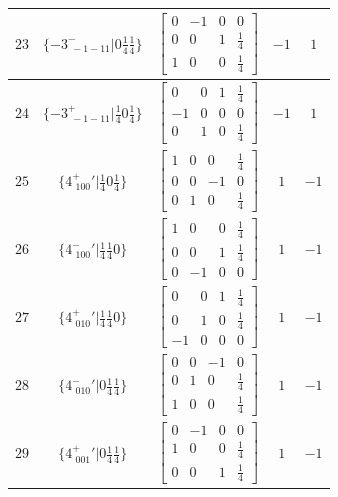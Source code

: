 \documentclass[fleqn,8pt]{jsarticle}
\begin{document}
\begin{longtable}{ccccc}
$ 23 $ & $ \{-3^{-}_{\,\,-1-11}|0 \frac{1}{4} \frac{1}{4}\} $ & $ \begin{bmatrix} 0 & -1 & 0 & 0 \\ 0 & 0 & 1 & \frac{1}{4} \\ 1 & 0 & 0 & \frac{1}{4} \end{bmatrix} $ & $ -1 $ & $ 1 $ \\ \hline
$ 24 $ & $ \{-3^{+}_{\,\,-1-11}|\frac{1}{4} 0 \frac{1}{4}\} $ & $ \begin{bmatrix} 0 & 0 & 1 & \frac{1}{4} \\ -1 & 0 & 0 & 0 \\ 0 & 1 & 0 & \frac{1}{4} \end{bmatrix} $ & $ -1 $ & $ 1 $ \\ \hline
$ 25 $ & $ \{4^{+}_{\,\,100}{}'|\frac{1}{4} 0 \frac{1}{4}\} $ & $ \begin{bmatrix} 1 & 0 & 0 & \frac{1}{4} \\ 0 & 0 & -1 & 0 \\ 0 & 1 & 0 & \frac{1}{4} \end{bmatrix} $ & $ 1 $ & $ -1 $ \\ \hline
$ 26 $ & $ \{4^{-}_{\,\,100}{}'|\frac{1}{4} \frac{1}{4} 0\} $ & $ \begin{bmatrix} 1 & 0 & 0 & \frac{1}{4} \\ 0 & 0 & 1 & \frac{1}{4} \\ 0 & -1 & 0 & 0 \end{bmatrix} $ & $ 1 $ & $ -1 $ \\ \hline
$ 27 $ & $ \{4^{+}_{\,\,010}{}'|\frac{1}{4} \frac{1}{4} 0\} $ & $ \begin{bmatrix} 0 & 0 & 1 & \frac{1}{4} \\ 0 & 1 & 0 & \frac{1}{4} \\ -1 & 0 & 0 & 0 \end{bmatrix} $ & $ 1 $ & $ -1 $ \\ \hline
$ 28 $ & $ \{4^{-}_{\,\,010}{}'|0 \frac{1}{4} \frac{1}{4}\} $ & $ \begin{bmatrix} 0 & 0 & -1 & 0 \\ 0 & 1 & 0 & \frac{1}{4} \\ 1 & 0 & 0 & \frac{1}{4} \end{bmatrix} $ & $ 1 $ & $ -1 $ \\ \hline
$ 29 $ & $ \{4^{+}_{\,\,001}{}'|0 \frac{1}{4} \frac{1}{4}\} $ & $ \begin{bmatrix} 0 & -1 & 0 & 0 \\ 1 & 0 & 0 & \frac{1}{4} \\ 0 & 0 & 1 & \frac{1}{4} \end{bmatrix} $ & $ 1 $ & $ -1 $ \\ \hline

\end{longtable}
\end{document}
